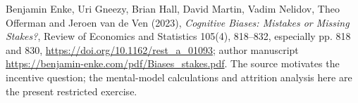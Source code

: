 \documentclass[11pt,a4paper]{article}
\theoremstyle{definition}
\theoremstyle{remark}
\begin{document}
Benjamin Enke, Uri Gneezy, Brian Hall, David Martin, Vadim Nelidov, Theo Offerman and Jeroen van de Ven (2023), \emph{Cognitive Biases: Mistakes or Missing Stakes?}, Review of Economics and Statistics 105(4), 818--832, especially pp. 818 and 830, \url{https://doi.org/10.1162/rest_a_01093}; author manuscript \url{https://benjamin-enke.com/pdf/Biases_stakes.pdf}. The source motivates the incentive question; the mental-model calculations and attrition analysis here are the present restricted exercise.
\end{document}
